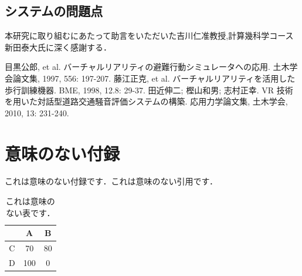 \documentclass[dvipdfmx]{ampbt}
\def\numberofspines{1}
\begin{document}
\subsection{システムの問題点}

\clearpage
\acknowledgment
本研究に取り組むにあたって助言をいただいた吉川仁准教授,計算幾科学コース新田泰大氏に深く感謝する．

\begin{thebibliography}{10}
目黒公郎, et al. バーチャルリアリティの避難行動シミュレータへの応用. 土木学会論文集, 1997, 556: 197-207.
藤江正克, et al. バーチャルリアリティを活用した歩行訓練機器. BME, 1998, 12.8: 29-37.
田近伸二; 樫山和男; 志村正幸. VR 技術を用いた対話型道路交通騒音評価システムの構築. 応用力学論文集, 土木学会, 2010, 13: 231-240.
\end{thebibliography}

\appendix

\section{意味のない付録}
これは意味のない付録です．これは意味のない引用です\cite{polya1945}．

\begin{table}[htbp]
  \caption{これは意味のない表です．}
  \centering
  \begin{tabular}{c|cc}
      &  A  &  B \\
    \hline
    C &  70 & 80 \\
    D & 100 &  0
  \end{tabular}
\end{table}

\fi
\ifoutputcover
\cleardoublepage
\makecover                      %
\makespine[\numberofspines]     %
\fi
\ifoutputabstractforsubmission
\makeabstractforsubmission      %
\fi
\end{document}
